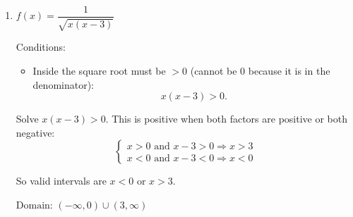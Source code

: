 \documentclass[14pt]{extarticle}
\begin{document}
\begin{enumerate}
  Combine:
  \[
  x \ge 2 \text{ and } x \ne 2 \Rightarrow x > 2.
  \]
  (Note: \(x = -2\) is already not in \(x \ge 2\), so we only need \(x > 2.\))

  \(\boxed{\text{Domain: } x > 2}\)

  \item \(f(x) = \dfrac{1}{\sqrt{x(x - 3)}}\)

  Conditions:
  \begin{itemize}
    \item Inside the square root must be \(> 0\) (cannot be 0 because it is in the denominator):
    \[
    x(x - 3) > 0.
    \]
  \end{itemize}

  Solve \(x(x - 3) > 0\). This is positive when both factors are positive or both negative:
  \[
  \begin{cases}
  x > 0 \text{ and } x - 3 > 0 \Rightarrow x > 3 \\
  x < 0 \text{ and } x - 3 < 0 \Rightarrow x < 0
  \end{cases}
  \]

  So valid intervals are \(x < 0\) or \(x > 3.\)

  \(\boxed{\text{Domain: } (-\infty,0) \cup (3,\infty)}\)
\end{enumerate}
\end{document}
